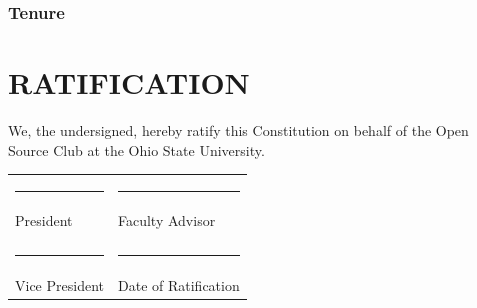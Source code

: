 \documentclass[12pt,letterpaper]{article}
\begin{document}
\subsubsection{Tenure}

\clearpage
\section*{RATIFICATION}

We, the undersigned, hereby ratify this Constitution on behalf of the Open Source Club at
the Ohio State University.

\vspace{1cm}
\begin{tabular}{p{3in}p{3in}}
\rule{3in}{0.5pt} & \rule{3in}{0.5pt} \\
President & Faculty Advisor \\
& \\
\rule{3in}{0.5pt} & \rule{3in}{0.5pt} \\
Vice President & Date of Ratification \\
\end{tabular}
\end{document}
